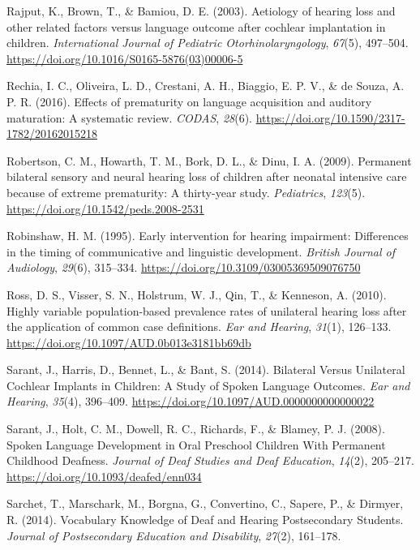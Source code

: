 \documentclass[english,man,floatsintext]{apa6}
\begin{document}
\leavevmode\hypertarget{ref-rajput2003}{}%
Rajput, K., Brown, T., \& Bamiou, D. E. (2003). Aetiology of hearing loss and other related factors versus language outcome after cochlear implantation in children. \emph{International Journal of Pediatric Otorhinolaryngology}, \emph{67}(5), 497--504. \url{https://doi.org/10.1016/S0165-5876(03)00006-5}

\leavevmode\hypertarget{ref-rechia2016}{}%
Rechia, I. C., Oliveira, L. D., Crestani, A. H., Biaggio, E. P. V., \& de Souza, A. P. R. (2016). Effects of prematurity on language acquisition and auditory maturation: A systematic review. \emph{CODAS}, \emph{28}(6). \url{https://doi.org/10.1590/2317-1782/20162015218}

\leavevmode\hypertarget{ref-robertson2009}{}%
Robertson, C. M., Howarth, T. M., Bork, D. L., \& Dinu, I. A. (2009). Permanent bilateral sensory and neural hearing loss of children after neonatal intensive care because of extreme prematurity: A thirty-year study. \emph{Pediatrics}, \emph{123}(5). \url{https://doi.org/10.1542/peds.2008-2531}

\leavevmode\hypertarget{ref-robinshaw1995}{}%
Robinshaw, H. M. (1995). Early intervention for hearing impairment: Differences in the timing of communicative and linguistic development. \emph{British Journal of Audiology}, \emph{29}(6), 315--334. \url{https://doi.org/10.3109/03005369509076750}

\leavevmode\hypertarget{ref-ross2010}{}%
Ross, D. S., Visser, S. N., Holstrum, W. J., Qin, T., \& Kenneson, A. (2010). Highly variable population-based prevalence rates of unilateral hearing loss after the application of common case definitions. \emph{Ear and Hearing}, \emph{31}(1), 126--133. \url{https://doi.org/10.1097/AUD.0b013e3181bb69db}

\leavevmode\hypertarget{ref-sarant2014}{}%
Sarant, J., Harris, D., Bennet, L., \& Bant, S. (2014). Bilateral Versus Unilateral Cochlear Implants in Children: A Study of Spoken Language Outcomes. \emph{Ear and Hearing}, \emph{35}(4), 396--409. \url{https://doi.org/10.1097/AUD.0000000000000022}

\leavevmode\hypertarget{ref-sarant2008}{}%
Sarant, J., Holt, C. M., Dowell, R. C., Richards, F., \& Blamey, P. J. (2008). Spoken Language Development in Oral Preschool Children With Permanent Childhood Deafness. \emph{Journal of Deaf Studies and Deaf Education}, \emph{14}(2), 205--217. \url{https://doi.org/10.1093/deafed/enn034}

\leavevmode\hypertarget{ref-sarchet2014}{}%
Sarchet, T., Marschark, M., Borgna, G., Convertino, C., Sapere, P., \& Dirmyer, R. (2014). Vocabulary Knowledge of Deaf and Hearing Postsecondary Students. \emph{Journal of Postsecondary Education and Disability}, \emph{27}(2), 161--178.
\end{document}
